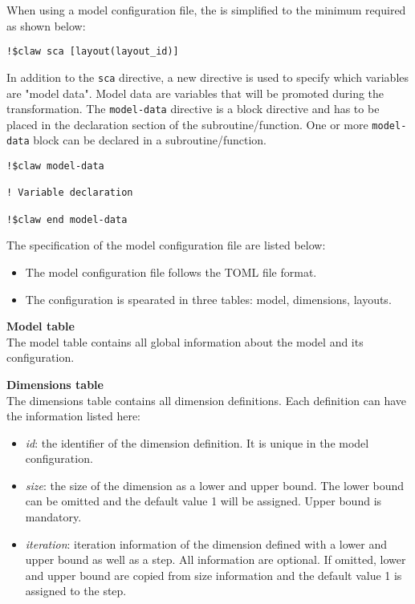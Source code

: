 When using a model configuration file, the is simplified to the minimum required
as shown below:
\begin{lstlisting}
!$claw sca [layout(layout_id)]
\end{lstlisting}

In addition to the \lstinline|sca| directive, a new directive is used to specify
which variables are "model data".
Model data are variables that will be promoted during the transformation. The 
\lstinline|model-data| directive is a block directive and has to be placed in 
the declaration section of the subroutine/function. One or more 
\lstinline|model-data| block can be declared in a subroutine/function.

\begin{lstlisting}
!$claw model-data

! Variable declaration

!$claw end model-data
\end{lstlisting}

  
The specification of the model configuration file are listed below:
\begin{itemize}
  \item The model configuration file follows the TOML file format. 
  \item The configuration is spearated in three tables: model, dimensions, 
        layouts.
\end{itemize}

\textbf{Model table}\\
The model table contains all global information about the model and its 
configuration.

\textbf{Dimensions table}\\
The dimensions table contains all dimension definitions. Each definition can 
have the information listed here: 
\begin{itemize}
  \item \textit{id}: the identifier of the dimension definition. It is unique 
        in the model configuration.
  \item \textit{size}: the size of the dimension as a lower and upper bound. 
        The lower bound can be omitted and the default value 1 will be assigned. 
        Upper bound is mandatory.
  \item \textit{iteration}: iteration information of the dimension defined with 
        a lower and upper bound as well as a step. All information are optional. 
        If omitted, lower and upper bound are copied from size information and 
        the default value 1 is assigned to the step.      
\end{itemize}


